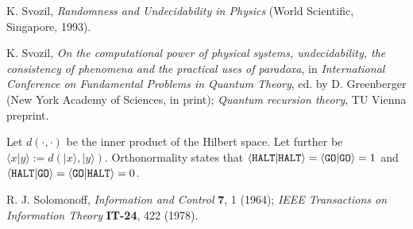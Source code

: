 \begin{thebibliography}{99}


K. Svozil,  {\sl Randomness and Undecidability in Physics}
(World Scientific, Singapore, 1993).

K. Svozil,
{\sl On the computational power of physical systems,
undecidability, the consistency of phenomena and
 the practical uses of paradoxa}, in
{\sl International Conference  on Fundamental Problems in
Quantum Theory}, ed. by D. Greenberger (New
York Academy of Sciences, in print);
 {\sl Quantum recursion theory}, TU Vienna preprint.

Let $d(\cdot ,\cdot )$ be the inner product of the Hilbert space.
Let further be $\langle x\vert y\rangle := d(\vert x\rangle , \vert
y\rangle
)$. Orthonormality states that
$\langle {\tt HALT} \vert {\tt HALT}\rangle =
\langle {\tt GO} \vert {\tt GO}\rangle =1$ and
$\langle {\tt HALT} \vert {\tt GO}\rangle =
\langle {\tt GO} \vert {\tt HALT}\rangle =0$.

 R. J. Solomonoff, {\sl Information and Control} {\bf 7}, 1 (1964);
 {\sl IEEE Transactions on Information Theory} {\bf
 IT-24}, 422 (1978).

\end{thebibliography}

